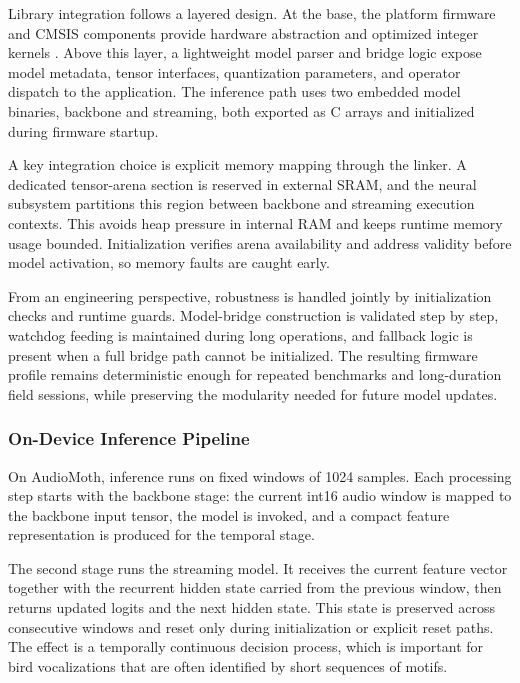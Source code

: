 \documentclass[a4paper,singleside,12pt]{report} %
\begin{document}
		\begin{sloppypar}
		Library integration follows a layered design. At the base, the platform firmware and CMSIS components provide hardware abstraction and optimized integer kernels \cite{cmsisnn2018}. Above this layer, a lightweight model parser and bridge logic expose model metadata, tensor interfaces, quantization parameters, and operator dispatch to the application. The inference path uses two embedded model binaries, backbone and streaming, both exported as C arrays and initialized during firmware startup.
		\end{sloppypar}

	A key integration choice is explicit memory mapping through the linker. A dedicated tensor-arena section is reserved in external SRAM, and the neural subsystem partitions this region between backbone and streaming execution contexts. This avoids heap pressure in internal RAM and keeps runtime memory usage bounded. Initialization verifies arena availability and address validity before model activation, so memory faults are caught early.

	From an engineering perspective, robustness is handled jointly by initialization checks and runtime guards. Model-bridge construction is validated step by step, watchdog feeding is maintained during long operations, and fallback logic is present when a full bridge path cannot be initialized. The resulting firmware profile remains deterministic enough for repeated benchmarks and long-duration field sessions, while preserving the modularity needed for future model updates.

\subsubsection{On-Device Inference Pipeline}
	On AudioMoth, inference runs on fixed windows of 1024 samples. Each processing step starts with the backbone stage: the current int16 audio window is mapped to the backbone input tensor, the model is invoked, and a compact feature representation is produced for the temporal stage.

	The second stage runs the streaming model. It receives the current feature vector together with the recurrent hidden state carried from the previous window, then returns updated logits and the next hidden state. This state is preserved across consecutive windows and reset only during initialization or explicit reset paths. The effect is a temporally continuous decision process, which is important for bird vocalizations that are often identified by short sequences of motifs.
\end{document}

